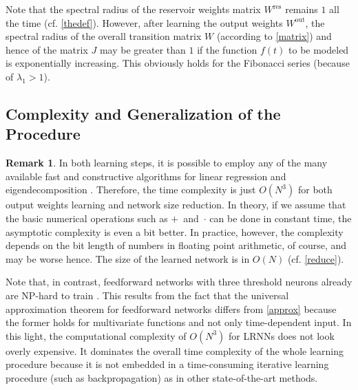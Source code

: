 \documentclass{sn-jnl}
\theoremstyle{definition}
\newtheorem{remk}{Remark}
\begin{document}
Note that the spectral radius of the reservoir weights matrix $W^\mathrm{res}$
remains $1$ all the time (cf. \cref{thedef}). However, after learning the output
weights $W^\mathrm{out}$, the spectral radius of the overall transition matrix
$W$ (according to \cref{matrix}) and hence of the matrix $J$ may
be greater than $1$ if the function $f(t)$ to be modeled is exponentially
increasing. This obviously holds for the Fibonacci series (because of
$\lambda_1>1$).

\subsection{Complexity and Generalization of the Procedure}

\begin{remk}\label{complexity}
In both learning steps, it is possible to employ any of the many available fast
and constructive algorithms for linear regression and eigendecomposition
\citep{DDH07}. Therefore, the time complexity is just $O(N^3)$ for both output
weights learning and network size reduction. In theory, if we assume that
the basic numerical operations such as $+$~and~$\cdot$ can be done in constant
time, the asymptotic complexity is even a bit better. In practice, however, the
complexity depends on the bit length of numbers in floating point arithmetic,
of course, and may be worse hence. The size of the learned network is in $O(N)$
(cf. \cref{reduce}).
\end{remk}

Note that, in contrast, feedforward networks with three threshold neurons
already are NP-hard to train \citep{BR92}. This results from the fact
that the universal approximation theorem for feedforward networks differs from
\cref{approx} because the former holds for multivariate functions and
not only time-dependent input. In this light, the computational complexity of
$O(N^3)$ for LRNNs does not look overly expensive. It dominates the
overall time complexity of the whole learning procedure because it is not
embedded in a time-consuming iterative learning procedure (such as backpropagation)
as in other state-of-the-art methods.

\end{document}
